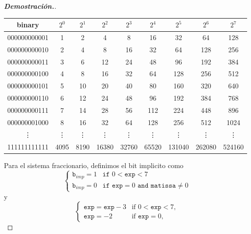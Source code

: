 \documentclass{article}
\begin{document}
\begin{enumerate}
\begin{mdframed}[
			      linecolor=darkgray,
			      backgroundcolor=white]
\begin{proof}[\textbf{Demostraci\'on.}]
			      \begin{center}
				      \begin{tabular}{c|cccccccc}
					      \textbf{binary} & $2^{0}$ & $2^{1}$ & $2^{2}$ & $2^{3}$ & $2^{4}$ & $2^{5}$ & $2^{6}$ & $2^{7}$ \\ \hline
					      000000000001    & 1       & 2       & 4       & 8       & 16      & 32      & 64      & 128     \\
					      000000000010    & 2       & 4       & 8       & 16      & 32      & 64      & 128     & 256     \\
					      000000000011    & 3       & 6       & 12      & 24      & 48      & 96      & 192     & 384     \\
					      000000000100    & 4       & 8       & 16      & 32      & 64      & 128     & 256     & 512     \\
					      000000000101    & 5       & 10      & 20      & 40      & 80      & 160     & 320     & 640     \\
					      000000000110    & 6       & 12      & 24      & 48      & 96      & 192     & 384     & 768     \\
					      000000000111    & 7       & 14      & 28      & 56      & 112     & 224     & 448     & 896     \\
					      000000001000    & 8       & 16      & 32      & 64      & 128     & 256     & 512     & 1024    \\
					      \vdots          & \vdots  & \vdots  & \vdots  & \vdots  & \vdots  & \vdots  & \vdots  & \vdots  \\
					      111111111111    & 4095    & 8190    & 16380   & 32760   & 65520   & 131040  & 262080  & 524160
				      \end{tabular}
			      \end{center}
			      Para el sistema fraccionario, definimos el bit implicito como
			      $$
				      \begin{cases}
					      \texttt{b}_{imp}= 1   & \texttt{if } 0 <\texttt{exp} < 7                           \\
					      \texttt{b}_{imp} =  0 & \texttt{if } \texttt{exp} = 0 \texttt{ and matissa} \neq 0
				      \end{cases}
			      $$
			      y
			      $$
				      \begin{cases}
					      \texttt{exp}=\texttt{exp}-3 & \text{if } 0 <\texttt{exp} < 7, \\
					      \texttt{exp} = -2           & \text{if } \texttt{exp} = 0,

\end{cases}$$
\end{proof}
\end{mdframed}
\end{enumerate}
\end{document}
